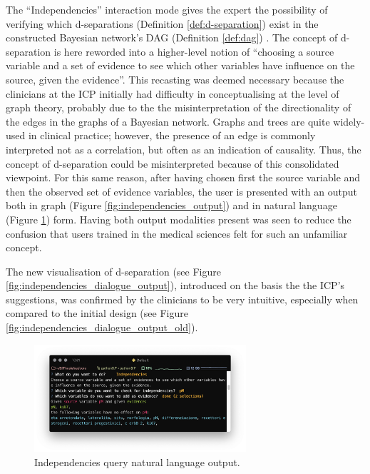 The \enquote{Independencies} interaction mode gives the expert the possibility of verifying which d-separations (Definition \ref{def:d-separation}) exist in the constructed Bayesian network's DAG (Definition \ref{def:dag}) .
The concept of d-separation is here reworded into a higher-level notion of \enquote{choosing a source variable and a set of evidence to see which other variables have influence on the source, given the evidence}.
This recasting was deemed necessary because the clinicians at the ICP initially had difficulty in conceptualising at the level of graph theory, probably due to the the misinterpretation of the directionality of the edges in the graphs of a Bayesian network.
Graphs and trees are quite widely-used in clinical practice; however, the presence of an edge is commonly interpreted not as a correlation, but often as an indication of causality. 
Thus, the concept of d-separation could be misinterpreted because of this consolidated viewpoint.
For this same reason, after having chosen first the source variable and then the observed set of evidence variables, the user is presented with an output both in graph (Figure \ref{fig:independencies_output}) and in natural language (Figure \ref{fig:sw_2_independencies}) form.
Having both output modalities present was seen to reduce the confusion that users trained in the medical sciences felt for such an unfamiliar concept.

The new visualisation of d-separation (see Figure \ref{fig:independencies_dialogue_output}), introduced on the basis the the ICP's suggestions, was confirmed by the clinicians to be very intuitive, especially when compared to the initial design (see Figure \ref{fig:independencies_dialogue_output_old}).

\begin{figure}[htbp]
\centerline{\includegraphics[width=0.7\textwidth]{results/images/sw_2_independencies}}
\caption{Independencies query natural language output.}
\label{fig:sw_2_independencies}
\end{figure}

